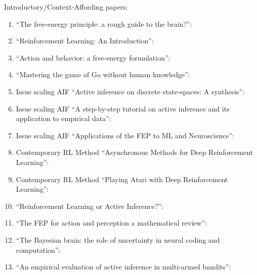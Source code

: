 \documentclass[onecolumn]{IEEEtran}
\begin{document}
Introductory/Context-Affording papers:
\begin{enumerate}
	\item ``The free-energy principle: a rough guide to the brain?'': \textcite{FEP-Rough-Guide-Brain}
	\item ``Reinforcement Learning: An Introduction'': \textcite{Reinforcement-Learning-An-Introduction}
	\item ``Action and behavior: a free-energy formulation'': \textcite{Action-Behaviour-FE}
	\item ``Mastering the game of Go without human knowledge'': \textcite{Mastering-Go-Without-Human-Knowledge}

	\item Issue scaling AIF ``Active inference on discrete state-spaces: A synthesis'': \textcite{AIF-Discrete-Action-Spaces-Synthesis}
	\item Issue scaling AIF ``A step-by-step tutorial on active inference and its application to empirical data'': \textcite{Step-by-Step-Tutorial-AIF-Empirical-Data}
	\item Issue scaling AIF ``Applications of the FEP to ML and Neuroscience'': \textcite{Applications-of-FEP-Machine-Learning-Neuroscience}

	\item Contemporary RL Method ``Asynchronous Methods for Deep Reinforcement Learning'': \textcite{Async-Methods-Deep-RL}
	\item Contemporary RL Method ``Playing Atari with Deep Reinforcement Learning'': \textcite{ATARI-Deep-RL}

	\item ``Reinforcement Learning or Active Inference?'': \textcite{RL-or-AIF}
	\item ``The FEP for action and perception a mathematical review'': \textcite{FEP-Mathematical-Review}
	\item ``The Bayesian brain: the role of uncertainty in neural coding and computation'': \textcite{The-Bayesian-Brain}
	\item ``An empirical evaluation of active inference in multi-armed bandits'': \textcite{Emperical-Eval-AIF-Multi-Arm-Bandits}
\end{enumerate}
\end{document}

